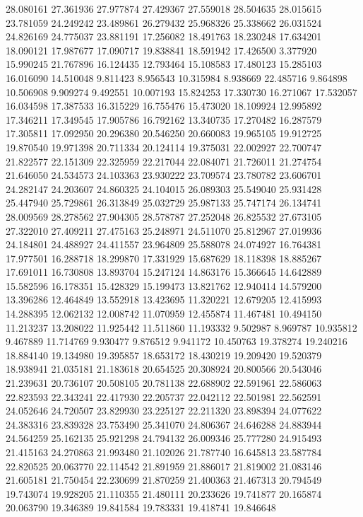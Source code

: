 28.080161
27.361936
27.977874
27.429367
27.559018
28.504635
28.015615
23.781059
24.249242
23.489861
26.279432
25.968326
25.338662
26.031524
24.826169
24.775037
23.881191
17.256082
18.491763
18.230248
17.634201
18.090121
17.987677
17.090717
19.838841
18.591942
17.426500
3.377920
15.990245
21.767896
16.124435
12.793464
15.108583
17.480123
15.285103
16.016090
14.510048
9.811423
8.956543
10.315984
8.938669
22.485716
9.864898
10.506908
9.909274
9.492551
10.007193
15.824253
17.330730
16.271067
17.532057
16.034598
17.387533
16.315229
16.755476
15.473020
18.109924
12.995892
17.346211
17.349545
17.905786
16.792162
13.340735
17.270482
16.287579
17.305811
17.092950
20.296380
20.546250
20.660083
19.965105
19.912725
19.870540
19.971398
20.711334
20.124114
19.375031
22.002927
22.700747
21.822577
22.151309
22.325959
22.217044
22.084071
21.726011
21.274754
21.646050
24.534573
24.103363
23.930222
23.709574
23.780782
23.606701
24.282147
24.203607
24.860325
24.104015
26.089303
25.549040
25.931428
25.447940
25.729861
26.313849
25.032729
25.987133
25.747174
26.134741
28.009569
28.278562
27.904305
28.578787
27.252048
26.825532
27.673105
27.322010
27.409211
27.475163
25.248971
24.511070
25.812967
27.019936
24.184801
24.488927
24.411557
23.964809
25.588078
24.074927
16.764381
17.977501
16.288718
18.299870
17.331929
15.687629
18.118398
18.885267
17.691011
16.730808
13.893704
15.247124
14.863176
15.366645
14.642889
15.582596
16.178351
15.428329
15.199473
13.821762
12.940414
14.579200
13.396286
12.464849
13.552918
13.423695
11.320221
12.679205
12.415993
14.288395
12.062132
12.008742
11.070959
12.455874
11.467481
10.494150
11.213237
13.208022
11.925442
11.511860
11.193332
9.502987
8.969787
10.935812
9.467889
11.714769
9.930477
9.876512
9.941172
10.450763
19.378274
19.240216
18.884140
19.134980
19.395857
18.653172
18.430219
19.209420
19.520379
18.938941
21.035181
21.183618
20.654525
20.308924
20.800566
20.543046
21.239631
20.736107
20.508105
20.781138
22.688902
22.591961
22.586063
22.823593
22.343241
22.417930
22.205737
22.042112
22.501981
22.562591
24.052646
24.720507
23.829930
23.225127
22.211320
23.898394
24.077622
24.383316
23.839328
23.753490
25.341070
24.806367
24.646288
24.883944
24.564259
25.162135
25.921298
24.794132
26.009346
25.777280
24.915493
21.415163
24.270863
21.993480
21.102026
21.787740
16.645813
23.587784
22.820525
20.063770
22.114542
21.891959
21.886017
21.819002
21.083146
21.605181
21.750454
22.230699
21.870259
21.400363
21.467313
20.794549
19.743074
19.928205
21.110355
21.480111
20.233626
19.741877
20.165874
20.063790
19.346389
19.841584
19.783331
19.418741
19.846648

